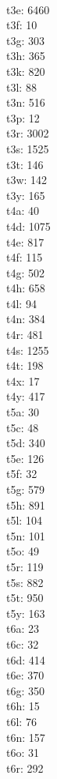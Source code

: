\begin{multicols}{8}
  \\t3e: 6460
  \\t3f: 10
  \\t3g: 303
  \\t3h: 365
  \\t3k: 820
  \\t3l: 88
  \\t3n: 516
  \\t3p: 12
  \\t3r: 3002
  \\t3s: 1525
  \\t3t: 146
  \\t3w: 142
  \\t3y: 165
  \\t4a: 40
  \\t4d: 1075
  \\t4e: 817
  \\t4f: 115
  \\t4g: 502
  \\t4h: 658
  \\t4l: 94
  \\t4n: 384
  \\t4r: 481
  \\t4s: 1255
  \\t4t: 198
  \\t4x: 17
  \\t4y: 417
  \\t5a: 30
  \\t5c: 48
  \\t5d: 340
  \\t5e: 126
  \\t5f: 32
  \\t5g: 579
  \\t5h: 891
  \\t5l: 104
  \\t5n: 101
  \\t5o: 49
  \\t5r: 119
  \\t5s: 882
  \\t5t: 950
  \\t5y: 163
  \\t6a: 23
  \\t6c: 32
  \\t6d: 414
  \\t6e: 370
  \\t6g: 350
  \\t6h: 15
  \\t6l: 76
  \\t6n: 157
  \\t6o: 31
  \\t6r: 292

\end{multicols}
